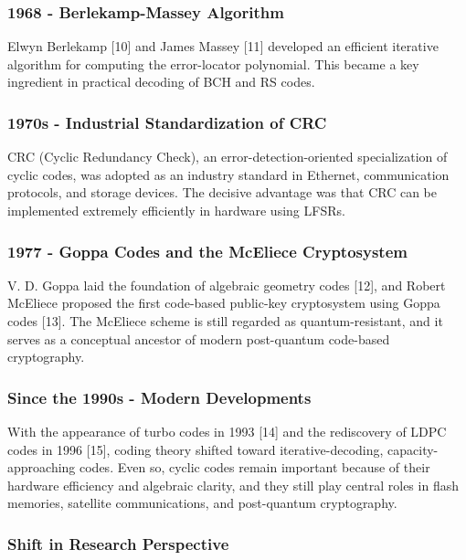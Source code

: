 \documentclass[
]{article}
\begin{document}
\subsubsection{1968 - Berlekamp-Massey
Algorithm}\label{berlekamp-massey-algorithm}

Elwyn Berlekamp {[}10{]} and James Massey {[}11{]} developed an
efficient iterative algorithm for computing the error-locator
polynomial. This became a key ingredient in practical decoding of BCH
and RS codes.

\subsubsection{1970s - Industrial Standardization of
CRC}\label{s---industrial-standardization-of-crc}

CRC (Cyclic Redundancy Check), an error-detection-oriented
specialization of cyclic codes, was adopted as an industry standard in
Ethernet, communication protocols, and storage devices. The decisive
advantage was that CRC can be implemented extremely efficiently in
hardware using LFSRs.

\subsubsection{1977 - Goppa Codes and the McEliece
Cryptosystem}\label{goppa-codes-and-the-mceliece-cryptosystem}

V. D. Goppa laid the foundation of algebraic geometry codes {[}12{]},
and Robert McEliece proposed the first code-based public-key
cryptosystem using Goppa codes {[}13{]}. The McEliece scheme is still
regarded as quantum-resistant, and it serves as a conceptual ancestor of
modern post-quantum code-based cryptography.

\subsubsection{Since the 1990s - Modern
Developments}\label{since-the-1990s---modern-developments}

With the appearance of turbo codes in 1993 {[}14{]} and the rediscovery
of LDPC codes in 1996 {[}15{]}, coding theory shifted toward
iterative-decoding, capacity-approaching codes. Even so, cyclic codes
remain important because of their hardware efficiency and algebraic
clarity, and they still play central roles in flash memories, satellite
communications, and post-quantum cryptography.

\subsubsection{Shift in Research
Perspective}\label{shift-in-research-perspective}
\end{document}
